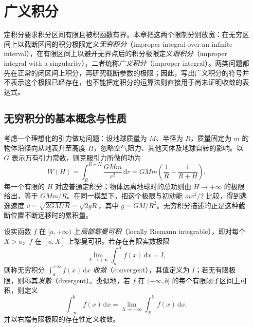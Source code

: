 \setcounter{chapter}{7} %
\chapter{广义积分}
\label{chap:improper-integrals}

定积分要求积分区间有限且被积函数有界。本章把这两个限制分别放宽：在无穷区间上以截断区间的积分极限定义\emph{无穷积分}（improper integral over an infinite interval），在有限区间上以避开无界点后的积分极限定义\emph{瑕积分}（improper integral with a singularity），二者统称\emph{广义积分}（improper integral）。两类问题都先在正常的闭区间上积分，再研究截断参数的极限；因此，写出广义积分的符号并不表示这个极限已经存在，也不能把定积分的运算法则直接用于尚未证明收敛的表达式。

\section{无穷积分的基本概念与性质}
\label{sec:infinite-integrals-concepts-and-properties}

考虑一个理想化的引力做功问题：设地球质量为 $M$、半径为 $R$，质量固定为 $m$ 的物体沿径向从地表升至高度 $H$，忽略空气阻力、其他天体及地球自转的影响。以 $G$ 表示万有引力常数，则克服引力所做的功为
\[
    W(H)=\int_R^{R+H}\frac{GMm}{r^2}\,\mathrm{d}r
        =GMm\left(\frac1R-\frac1{R+H}\right).
\]
每一个有限的 $H$ 对应普通定积分；物体远离地球时的总功则由 $H\to+\infty$ 的极限给出，等于 $GMm/R$。在同一模型下，把这个极限与初动能 $mv^2/2$ 比较，得到逃逸速度 $v=\sqrt{2GM/R}=\sqrt{2gR}$，其中 $g=GM/R^2$。无穷积分描述的正是这种截断位置不断远移时的累积量。

\begin{definition}[无穷积分及其收敛性]
\label{def:improper-integrals-at-infinity}
设实函数 $f$ 在 $[a,+\infty)$ 上\emph{局部黎曼可积}（locally Riemann integrable），即对每个 $X>a$，$f$ 在 $[a,X]$ 上黎曼可积。若存在有限实数极限
\begin{equation}
    \lim_{X\to+\infty}\int_a^X f(x)\,\mathrm{d}x=I,
    \label{eq:improper-integral-right-limit}
\end{equation}
则称无穷积分 $\int_a^{+\infty}f(x)\,\mathrm{d}x$ \emph{收敛}（convergent），其值定义为 $I$；若无有限极限，则称其\emph{发散}（divergent）。类似地，若 $f$ 在 $(-\infty,b]$ 的每个有限闭子区间上可积，则定义
\[
    \int_{-\infty}^b f(x)\,\mathrm{d}x
    =\lim_{X\to-\infty}\int_X^b f(x)\,\mathrm{d}x,
\]
并以右端有限极限的存在性定义收敛。
\end{definition}

